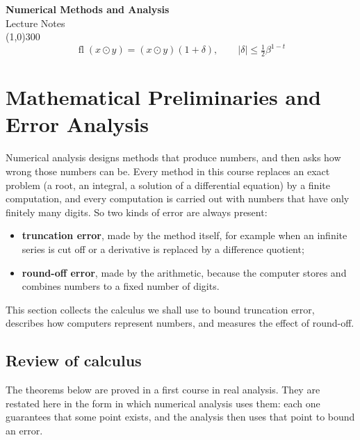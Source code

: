 \documentclass[11pt,a4paper]{article}
\numberwithin{equation}{section}
\DeclareMathOperator{\fl}{fl}
\theoremstyle{definition}
\begin{document}
\begin{titlepage}
\thispagestyle{empty}
\begin{center}
\vspace*{3cm}
{\Huge\bfseries Numerical Methods and Analysis}\\[1.2cm]
{\large Lecture Notes}\\[2.5cm]
\line(1,0){300}\\[1.5cm]
$$\fl(x\odot y) = (x\odot y)(1+\delta),\qquad |\delta|\leq \tfrac{1}{2}\beta^{1-t}$$
\end{center}
\end{titlepage}

\tableofcontents
\thispagestyle{empty}
\clearpage
\setcounter{page}{1}

\section{Mathematical Preliminaries and Error Analysis}
\label{sec:prelim}

Numerical analysis designs methods that produce numbers, and then asks how wrong those numbers can be. Every method in this course
replaces an exact problem (a root, an integral, a solution of a differential equation) by a finite computation, and every computation
is carried out with numbers that have only finitely many digits. So two kinds of error are always present:
\begin{itemize}
\item \textbf{truncation error}, made by the method itself, for example when an infinite series is cut off or a derivative is replaced
by a difference quotient;
\item \textbf{round-off error}, made by the arithmetic, because the computer stores and combines numbers to a fixed number of digits.
\end{itemize}
This section collects the calculus we shall use to bound truncation error, describes how computers represent numbers, and measures the
effect of round-off.

\subsection{Review of calculus}
\label{sec:calc}

The theorems below are proved in a first course in real analysis. They are restated here in the form in which numerical analysis uses
them: each one guarantees that some point exists, and the analysis then uses that point to bound an error.
\end{document}
